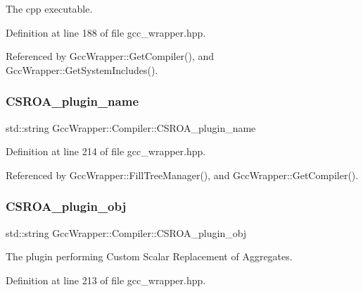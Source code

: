 The cpp executable. 



Definition at line 188 of file gcc\+\_\+wrapper.\+hpp.



Referenced by Gcc\+Wrapper\+::\+Get\+Compiler(), and Gcc\+Wrapper\+::\+Get\+System\+Includes().

\mbox{\label{classGccWrapper_1_1Compiler_a5154da94a2b88be384431e8a464c7485}} 
\subsubsection{\texorpdfstring{C\+S\+R\+O\+A\+\_\+plugin\+\_\+name}{CSROA\_plugin\_name}}
{\footnotesize\ttfamily std\+::string Gcc\+Wrapper\+::\+Compiler\+::\+C\+S\+R\+O\+A\+\_\+plugin\+\_\+name}



Definition at line 214 of file gcc\+\_\+wrapper.\+hpp.



Referenced by Gcc\+Wrapper\+::\+Fill\+Tree\+Manager(), and Gcc\+Wrapper\+::\+Get\+Compiler().

\mbox{\label{classGccWrapper_1_1Compiler_af1cd744ca4a45cdcb44c2ab10265e10f}} 
\subsubsection{\texorpdfstring{C\+S\+R\+O\+A\+\_\+plugin\+\_\+obj}{CSROA\_plugin\_obj}}
{\footnotesize\ttfamily std\+::string Gcc\+Wrapper\+::\+Compiler\+::\+C\+S\+R\+O\+A\+\_\+plugin\+\_\+obj}



The plugin performing Custom Scalar Replacement of Aggregates. 



Definition at line 213 of file gcc\+\_\+wrapper.\+hpp.



